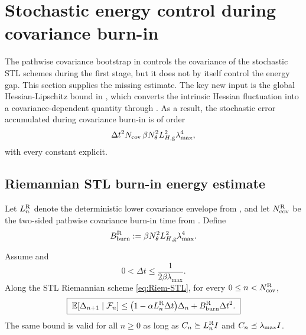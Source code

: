 \section{Stochastic energy control during covariance burn-in}
\label{sec:stochastic-burnin-energy}

The pathwise covariance bootstrap in  controls the covariance
of the stochastic STL schemes during the first stage, but it does not by itself control the
energy gap. This section supplies the missing estimate. The key new input is the global
Hessian-Lipschitz bound in , which converts the intrinsic
Hessian fluctuation into a covariance-dependent quantity through . As a
result, the stochastic error accumulated during covariance burn-in is of order
\[
    \Delta t^2 N_{\mathrm{cov}}\,\beta N_\theta^2L_{H,\mathrm g}^2\lambda_{\max}^4,
\]
with every constant explicit.

\subsection{Riemannian STL burn-in energy estimate}

Let $L_n^{\mathrm{R}}$ denote the deterministic lower covariance envelope from
, and let $N_{\mathrm{cov}}^{\mathrm{R}}$ be the two-sided pathwise covariance
burn-in time from . Define
\[
    B_{\mathrm{burn}}^{\mathrm{R}}
    :=
    \beta N_\theta^2L_{H,\mathrm g}^2\lambda_{\max}^4 .
\]

\begin{lemma}
\label{lem:Riem-STL-burnin-descent}
Assume  and
\[
    0<\Delta t\leq \frac1{2\beta\lambda_{\max}}.
\]
Along the STL Riemannian scheme \eqref{eq:Riem-STL}, for every
$0\leq n<N_{\mathrm{cov}}^{\mathrm{R}}$,
\[
    \boxed{\;
    \mathbb{E}[\Delta_{n+1}\mid\mathcal{F}_n]
    \leq
    \bigl(1-\alpha L_n^{\mathrm{R}}\Delta t\bigr)\Delta_n
    +
    B_{\mathrm{burn}}^{\mathrm{R}}\Delta t^2 .
    \;}
\]
The same bound is valid for all $n\geq0$ as long as
$C_n\succeq L_n^{\mathrm{R}}I$ and $C_n\preceq\lambda_{\max}I$.
\end{lemma}

